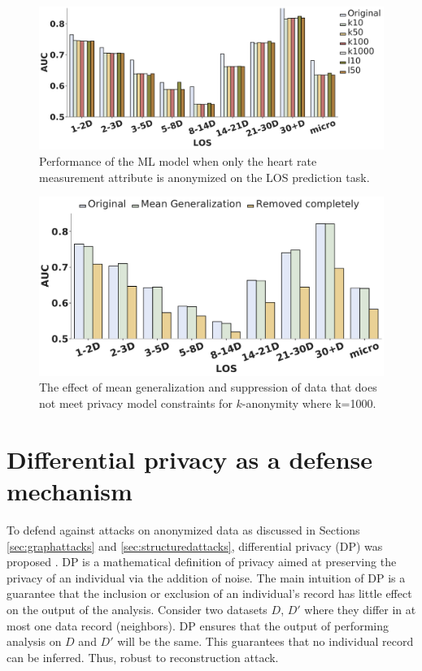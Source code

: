 \documentclass{bioinfo}
\begin{document}
\begin{figure}[!tpb]%
\centerline{\includegraphics[width=\linewidth]{los_pred_heart.pdf}}
\caption{Performance of the ML model when only the heart rate measurement attribute is anonymized on the LOS prediction task.}\label{heart}
\end{figure}

\begin{figure}[!tpb]%
\centerline{\includegraphics[width=\linewidth]{los_pred_1kcombined.pdf}}
\caption{The effect of mean generalization and suppression of data that does not meet privacy model constraints for $k$-anonymity where k=1000.}\label{k1kcompleteremove}
\end{figure}




\section{Differential privacy as a defense mechanism}
\label{sec:soaprivacypreservetech}
To defend against attacks on anonymized data as discussed in Sections \ref{sec:graphattacks} and \ref{sec:structuredattacks}, differential privacy (DP) was proposed \cite{CynthiaDwork10.1561/0400000042}. 
DP is a mathematical definition of privacy aimed at preserving the privacy of an individual via the addition of noise. The main intuition of DP is a guarantee that the inclusion or exclusion of an individual's record has little effect on the output of the analysis. Consider two datasets $D$, $D'$ where they differ in at most one data record (neighbors). DP ensures that the output of performing analysis on $D$ and $D'$ will be the same. This guarantees that no individual record can be inferred. Thus, robust to reconstruction attack.
\end{document}
